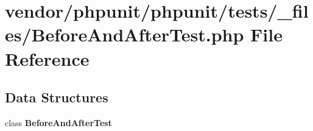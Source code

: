 \section{vendor/phpunit/phpunit/tests/\+\_\+files/\+Before\+And\+After\+Test.php File Reference}
\label{_before_and_after_test_8php}
\subsection*{Data Structures}
\begin{DoxyCompactItemize}
\item 
class {\bf Before\+And\+After\+Test}
\end{DoxyCompactItemize}
